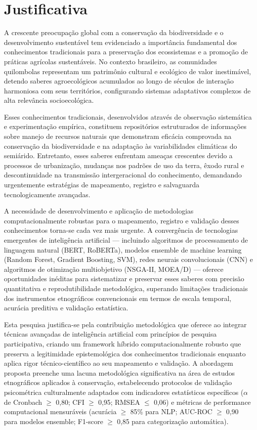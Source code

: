 \section{Justificativa}

A crescente preocupação global com a conservação da biodiversidade e o desenvolvimento sustentável tem evidenciado a importância fundamental dos conhecimentos tradicionais para a preservação dos ecossistemas e a promoção de práticas agrícolas sustentáveis. No contexto brasileiro, as comunidades quilombolas representam um patrimônio cultural e ecológico de valor inestimável, detendo saberes agroecológicos acumulados ao longo de séculos de interação harmoniosa com seus territórios, configurando sistemas adaptativos complexos de alta relevância socioecológica.

Esses conhecimentos tradicionais, desenvolvidos através de observação sistemática e experimentação empírica, constituem repositórios estruturados de informações sobre manejo de recursos naturais que demonstram eficácia comprovada na conservação da biodiversidade e na adaptação às variabilidades climáticas do semiárido. Entretanto, esses saberes enfrentam ameaças crescentes devido a processos de urbanização, mudanças nos padrões de uso da terra, êxodo rural e descontinuidade na transmissão intergeracional do conhecimento, demandando urgentemente estratégias de mapeamento, registro e salvaguarda tecnologicamente avançadas.

A necessidade de desenvolvimento e aplicação de metodologias computacionalmente robustas para o mapeamento, registro e validação desses conhecimentos torna-se cada vez mais urgente. A convergência de tecnologias emergentes de inteligência artificial — incluindo algoritmos de processamento de linguagem natural (BERT, RoBERTa), modelos ensemble de machine learning (Random Forest, Gradient Boosting, SVM), redes neurais convolucionais (CNN) e algoritmos de otimização multiobjetivo (NSGA-II, MOEA/D) — oferece oportunidades inéditas para sistematizar e preservar esses saberes com precisão quantitativa e reprodutibilidade metodológica, superando limitações tradicionais dos instrumentos etnográficos convencionais em termos de escala temporal, acurácia preditiva e validação estatística.

Esta pesquisa justifica-se pela contribuição metodológica que oferece ao integrar técnicas avançadas de inteligência artificial com princípios de pesquisa participativa, criando um framework híbrido computacionalmente robusto que preserva a legitimidade epistemológica dos conhecimentos tradicionais enquanto aplica rigor técnico-científico ao seu mapeamento e validação. A abordagem proposta preenche uma lacuna metodológica significativa na área de estudos etnográficos aplicados à conservação, estabelecendo protocolos de validação psicométrica culturalmente adaptados com indicadores estatísticos específicos ($\alpha$ de Cronbach $\geq$ 0,80; CFI $\geq$ 0,95; RMSEA $\leq$ 0,06) e métricas de performance computacional mensuráveis (acurácia $\geq$ 85\% para NLP; AUC-ROC $\geq$ 0,90 para modelos ensemble; F1-score $\geq$ 0,85 para categorização automática).

